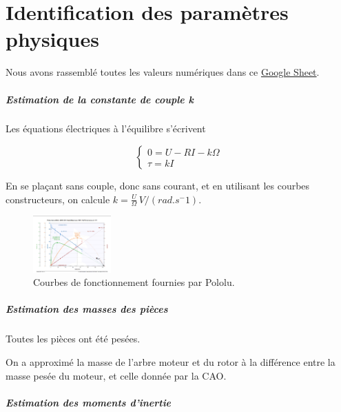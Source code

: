 \documentclass{report}
\begin{document}
\chapter{Identification des paramètres physiques}

Nous avons rassemblé toutes les valeurs numériques dans ce 
\href{https://docs.google.com/spreadsheets/d/1PVCPAeFXgacQK3YaMxcYYtDlWB_0VT0cpRnJDznpAQc/edit?pli=1#gid=0
}{Google Sheet}.

\paragraph{Estimation de la constante de couple k}

Les équations électriques à l'équilibre s'écrivent

\begin{equation*}
    \begin{cases}
        0 = U - RI - k\Omega \\
        \tau = kI       
    \end{cases}
\end{equation*}

En se plaçant sans couple, donc sans courant, et en utilisant les courbes constructeurs, on calcule
$k=\frac{U}{\Omega} \, V/(rad.s^-1)$.

\begin{figure}[h]  %
    \centering
    \includegraphics[width=3cm]{figures/courbes-construc.png}
    \caption{Courbes de fonctionnement fournies par Pololu.}
\end{figure}

\paragraph{Estimation des masses des pièces}
Toutes les pièces ont été pesées.

On a approximé la masse de l'arbre moteur et du rotor à la différence
entre la masse pesée du moteur, et celle donnée par la CAO.

\paragraph{Estimation des moments d'inertie}
\end{document}
